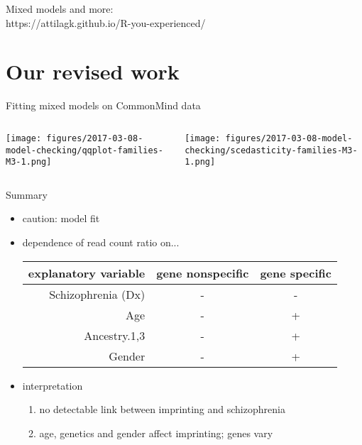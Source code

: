 \documentclass[usenames,dvipsnames]{beamer} %
\begin{document}
\begin{frame}
Mixed models and more:\\
https://attilagk.github.io/R-you-experienced/ 
\end{frame}

\section{Our revised work}

\begin{frame}{Fitting mixed models on CommonMind data}
\begin{columns}[t]
\begin{column}{0.5\textwidth}

\texttt{[image: figures/2017-03-08-model-checking/qqplot-families-M3-1.png]}
\end{column}

\begin{column}{0.5\textwidth}

\texttt{[image: figures/2017-03-08-model-checking/scedasticity-families-M3-1.png]}
\end{column}
\end{columns}
\end{frame}


\begin{frame}{Summary}
\begin{itemize}
\item caution: model fit
\item<2-> dependence of read count ratio on...
{\footnotesize
\begin{tabular}{r|cc}
explanatory variable & gene nonspecific & gene specific \\
\hline
Schizophrenia (Dx) & - & - \\
Age & - & + \\
Ancestry.{1,3} & - & + \\
Gender & - & + \\
\end{tabular}
}
\item<3> interpretation
\begin{enumerate}
\item no detectable link between imprinting and schizophrenia
\item age, genetics and gender affect imprinting;
genes vary
\end{enumerate}
\end{itemize}
\end{frame}
\end{document}
